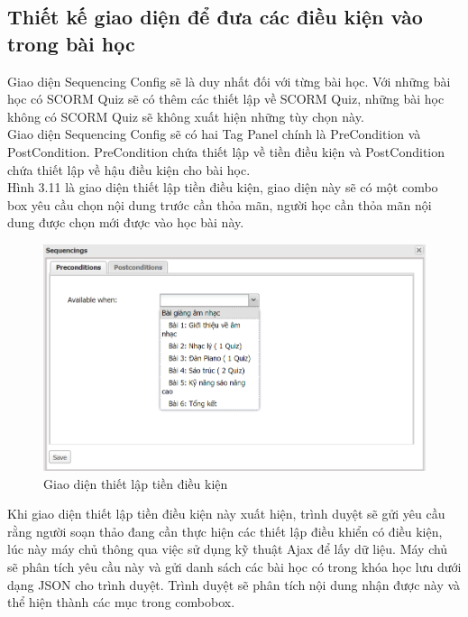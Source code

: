 \subsection{Thiết kế giao diện để đưa các điều kiện vào trong bài học}

	Giao diện Sequencing Config sẽ là duy nhất  đối với từng bài học. Với những bài học có SCORM Quiz sẽ có thêm các thiết lập về SCORM Quiz, những bài học không có SCORM Quiz sẽ không xuất hiện những tùy chọn này.\\
	
	Giao diện Sequencing Config sẽ có hai Tag Panel chính là PreCondition và PostCondition. PreCondition chứa thiết lập về tiền điều kiện và PostCondition chứa thiết lập về hậu điều kiện cho bài học.\\
	
	Hình 3.11 là giao diện thiết lập tiền điều kiện, giao diện này sẽ có một combo box yêu cầu chọn nội dung trước cần thỏa mãn, người học cần thỏa mãn nội dung được chọn mới được vào học bài này.

		\begin{center}
	\begin{figure}[htp]
		\begin{center}
			\includegraphics[width=15cm]{Chapter3/Pictures/picture311.png}
		\end{center}
		\caption{Giao diện thiết lập tiền điều kiện}
		\label{refpicture413}
	\end{figure}
\end{center}

	Khi giao diện thiết lập tiền điều kiện này xuất hiện, trình duyệt sẽ gửi yêu cầu rằng người soạn thảo đang cần thực hiện các thiết lập điều khiển có điều kiện, lúc này máy chủ thông qua việc sử dụng kỹ thuật Ajax để lấy dữ liệu. Máy chủ sẽ phân tích yêu cầu này và gửi danh sách các bài học có trong khóa học lưu dưới dạng JSON cho trình duyệt. Trình duyệt sẽ phân tích nội dung nhận được này và thể hiện thành các mục trong combobox.


